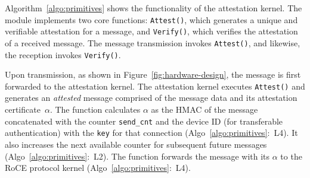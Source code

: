 Algorithm~\ref{algo:primitives} shows the functionality of the attestation kernel. The module implements two core functions: {\tt Attest()}, which generates a unique and verifiable attestation for a message, and {\tt Verify()}, which verifies the attestation of a received message. The message transmission invokes {\tt Attest()}, and likewise, the reception invokes {\tt Verify()}. 

Upon transmission, as shown in Figure~\ref{fig:hardware-design}, the message is first forwarded to the attestation kernel. 
The attestation kernel executes \texttt{Attest()} and generates an {\em attested} message comprised of the message data and its attestation certificate~$\alpha$. The function calculates $\alpha$ as the HMAC of the message concatenated with the counter {\tt send\_cnt} and the device ID (for transferable authentication) with the {\tt key} for that connection (Algo~\ref{algo:primitives}:~L4). It also increases the next available counter for subsequent future messages (Algo~\ref{algo:primitives}:~L2). The function forwards the message with its $\alpha$ to the RoCE protocol kernel (Algo~\ref{algo:primitives}:~L4).

